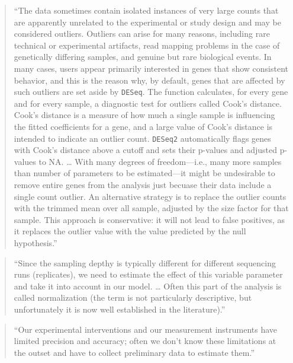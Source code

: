 \documentclass[]{tufte-book}
\begin{document}
\begin{quote}
``The data sometimes contain isolated instances of very large counts that
are apparently unrelated to the experimental or study design and may be
considered outliers. Outliers can arise for many reasons, including rare
technical or experimental artifacts, read mapping problems in the case of
genetically differing samples, and genuine but rare biological events. In
many cases, users appear primarily interested in genes that show consistent
behavior, and this is the reason why, by default, genes that are affected by such
outliers are set aside by \texttt{DESeq}. The function calculates, for every gene
and for every sample, a diagnostic test for outliers called Cook's distance.
Cook's distance is a measure of how much a single sample is influencing the
fitted coefficients for a gene, and a large value of Cook's distance is
intended to indicate an outlier count. \texttt{DESeq2} automatically flags genes
with Cook's distance above a cutoff and sets their p-values and adjusted
p-values to NA. \ldots{} With many degrees of freedom---i.e., many more samples
than number of parameters to be estimated---it might be undesirable to remove
entire genes from the analysis just becuase their data include a single
count outlier. An alternative strategy is to replace the outlier counts with
the trimmed mean over all sample, adjusted by the size factor for that
sample. This approach is conservative: it will not lead to false positives,
as it replaces the outlier value with the value predicted by the null hypothesis.'' \citep{holmes2018modern}
\end{quote}

\begin{quote}
``Since the sampling depthy is typically different for different sequencing
runs (replicates), we need to estimate the effect of this variable parameter
and take it into account in our model. \ldots{} Often this part of the analysis
is called normalization (the term is not particularly descriptive, but
unfortunately it is now well established in the literature).'' \citep{holmes2018modern}
\end{quote}

\begin{quote}
``Our experimental interventions and our measurement instruments have limited
precision and accuracy; often we don't know these limitations at the outset and
have to collect preliminary data to estimate them.'' \citep{holmes2018modern}
\end{quote}
\end{document}
